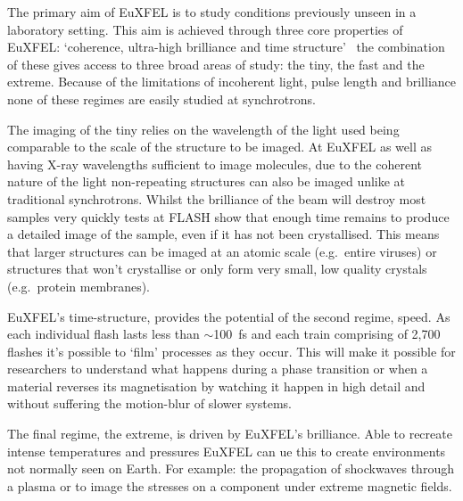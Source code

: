 The primary aim of EuXFEL is to study conditions previously unseen in a laboratory setting. This aim is achieved through three core properties of EuXFEL: `coherence, ultra-high brilliance and time structure'~\cite{CITETION FOR THE TDR} the combination of these gives access to three broad areas of study: the tiny, the fast and the extreme. Because of the limitations of incoherent light, pulse length and brilliance none of these regimes are easily studied at synchrotrons.

The imaging of the tiny relies on the wavelength of the light used being comparable to the scale of the structure to be imaged. At EuXFEL as well as having X-ray wavelengths sufficient to image molecules, due to the coherent nature of the light non-repeating structures can also be imaged unlike at traditional synchrotrons. Whilst the brilliance of the beam will destroy most samples very quickly tests at FLASH show that enough time remains to produce a detailed image of the sample, even if it has not been crystallised. This means that larger structures can be imaged at an atomic scale (e.g.\ entire viruses) or structures that won't crystallise or only form very small, low quality crystals (e.g.\ protein membranes).

EuXFEL's time-structure, provides the potential of the second regime, speed. As each individual flash lasts less than \( \sim \)100~fs and each train comprising of 2,700 flashes it's possible to `film' processes as they occur. This will make it possible for researchers to understand what happens during a phase transition or when a material reverses its magnetisation by watching it happen in high detail and without suffering the motion-blur of slower systems.

The final regime, the extreme, is driven by EuXFEL's brilliance. Able to recreate intense temperatures and pressures EuXFEL can ue this to create environments not normally seen on Earth. For example: the propagation of shockwaves through a plasma or to image the stresses on a component under extreme magnetic fields.
